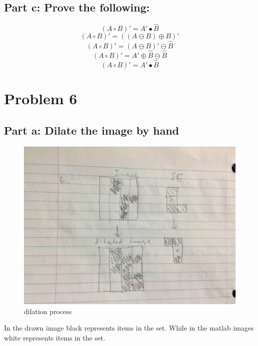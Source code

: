 \documentclass{article}
\begin{document}
	\subsection{Part c: Prove the following:}
	\[(A\circ{B})' = A'\bullet{\hat{B}}\]
	\[(A\circ{B})' = ((A\ominus{B})\oplus{B})'\]
	\[(A\circ{B})' = (A\ominus{B})'\ominus{\hat{B}}\]
	\[(A\circ{B})' = A'\oplus{\hat{B}}\ominus{\hat{B}}\]
	\[(A\circ{B})' = A'\bullet{\hat{B}}\]
	
	\newpage
	\section{Problem 6}
	\subsection{Part a: Dilate the image by hand}
	\begin{figure}[H]
		\includegraphics[width=\linewidth]{Q6/fig1.JPG}
		\caption{dilation process}
	\end{figure}
	In the drawn image black represents items in the set. While in the matlab images white represents items in the set.
\end{document}
